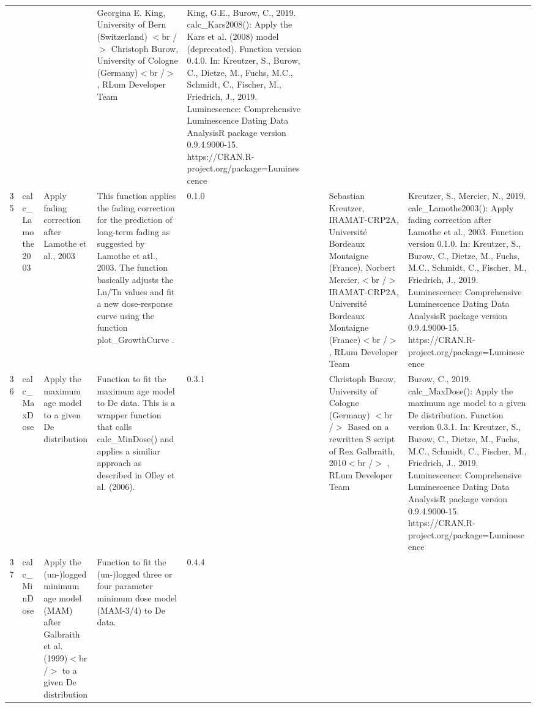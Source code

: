 \begin{table}[ht]
\begin{tabular}{rllllllll}
 &  &  & Georgina E. King, University of Bern (Switzerland)  $<$br /$>$ Christoph Burow, University of Cologne (Germany)$<$br /$>$ , RLum Developer Team & King, G.E., Burow, C., 2019. calc\_Kars2008(): Apply the Kars et al. (2008) model (deprecated). Function version 0.4.0. In: Kreutzer, S., Burow, C., Dietze, M., Fuchs, M.C., Schmidt, C., Fischer, M., Friedrich, J., 2019. Luminescence: Comprehensive Luminescence Dating Data AnalysisR package version 0.9.4.9000-15. https://CRAN.R-project.org/package=Luminescence
 \\ 
  35 & calc\_Lamothe2003 & Apply fading correction after Lamothe et al., 2003 & This function applies the fading correction for the prediction of long-term fading as suggested by Lamothe et atl., 2003. The function basically adjusts the Ln/Tn values and fit a new dose-response curve using the function  plot\_GrowthCurve . & 0.1.0
 &  &  & Sebastian Kreutzer, IRAMAT-CRP2A, Université Bordeaux Montaigne (France), Norbert Mercier,$<$br /$>$ IRAMAT-CRP2A, Université Bordeaux Montaigne (France)$<$br /$>$ , RLum Developer Team & Kreutzer, S., Mercier, N., 2019. calc\_Lamothe2003(): Apply fading correction after Lamothe et al., 2003. Function version 0.1.0. In: Kreutzer, S., Burow, C., Dietze, M., Fuchs, M.C., Schmidt, C., Fischer, M., Friedrich, J., 2019. Luminescence: Comprehensive Luminescence Dating Data AnalysisR package version 0.9.4.9000-15. https://CRAN.R-project.org/package=Luminescence
 \\ 
  36 & calc\_MaxDose & Apply the maximum age model to a given De distribution & Function to fit the maximum age model to De data. This is a wrapper function that calls calc\_MinDose() and applies a similiar approach as described in Olley et al. (2006). & 0.3.1
 &  &  & Christoph Burow, University of Cologne (Germany)  $<$br /$>$ Based on a rewritten S script of Rex Galbraith, 2010$<$br /$>$ , RLum Developer Team & Burow, C., 2019. calc\_MaxDose(): Apply the maximum age model to a given De distribution. Function version 0.3.1. In: Kreutzer, S., Burow, C., Dietze, M., Fuchs, M.C., Schmidt, C., Fischer, M., Friedrich, J., 2019. Luminescence: Comprehensive Luminescence Dating Data AnalysisR package version 0.9.4.9000-15. https://CRAN.R-project.org/package=Luminescence
 \\ 
  37 & calc\_MinDose & Apply the (un-)logged minimum age model (MAM) after Galbraith et al. (1999)$<$br /$>$ to a given De distribution & Function to fit the (un-)logged three or four parameter minimum dose model (MAM-3/4) to De data. & 0.4.4

\end{tabular}
\end{table}
